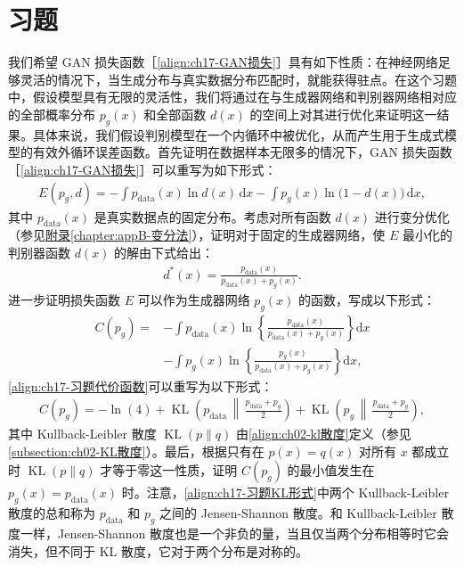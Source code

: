 \documentclass[../../main.tex]{subfiles}
\begin{document}
\section{习题}\label{section:ch17-习题}

\begin{exercise}[$\star\star\star$]\label{exercise:ch17-01}
我们希望 GAN 损失函数［\eqref{align:ch17-GAN损失}］具有如下性质：在神经网络足够灵活的情况下，当生成分布与真实数据分布匹配时，就能获得驻点。在这个习题中，假设模型具有无限的灵活性，我们将通过在与生成器网络和判别器网络相对应的全部概率分布 $p_g(x)$ 和全部函数 $d(x)$ 的空间上对其进行优化来证明这一结果。具体来说，我们假设判别模型在一个内循环中被优化，从而产生用于生成式模型的有效外循环误差函数。首先证明在数据样本无限多的情况下，GAN 损失函数［\eqref{align:ch17-GAN损失}］可以重写为如下形式：
\begin{align}
E(p_g,d)=-\int p_{\mathrm{data}}(x)\ln d(x)\,\mathrm{d}x-\int p_g(x)\ln\big(1-d(x)\big)\,\mathrm{d}x,
\label{align:ch17-习题积分形式}
\end{align}
其中 $p_{\mathrm{data}}(x)$ 是真实数据点的固定分布。考虑对所有函数 $d(x)$ 进行变分优化（参见\hyperref[chapter:appB-变分法]{附录\ref*{chapter:appB-变分法}}），证明对于固定的生成器网络，使 $E$ 最小化的判别器函数 $d(x)$ 的解由下式给出：
\begin{align}
d^*(x)=\frac{p_{\mathrm{data}}(x)}{p_{\mathrm{data}}(x)+p_g(x)}.
\label{align:ch17-习题最优判别器}
\end{align}
进一步证明损失函数 $E$ 可以作为生成器网络 $p_g(x)$ 的函数，写成以下形式：
\begin{align}
C(p_g)={}&-\int p_{\mathrm{data}}(x)\ln\left\{\frac{p_{\mathrm{data}}(x)}{p_{\mathrm{data}}(x)+p_g(x)}\right\}\mathrm{d}x\nonumber\\
&-\int p_g(x)\ln\left\{\frac{p_g(x)}{p_{\mathrm{data}}(x)+p_g(x)}\right\}\mathrm{d}x,
\label{align:ch17-习题代价函数}
\end{align}
\eqref{align:ch17-习题代价函数}可以重写为以下形式：
\begin{align}
C(p_g)=-\ln(4)+\operatorname{KL}\left(p_{\mathrm{data}}\,\middle\|\,\frac{p_{\mathrm{data}}+p_g}{2}\right)+\operatorname{KL}\left(p_g\,\middle\|\,\frac{p_{\mathrm{data}}+p_g}{2}\right),
\label{align:ch17-习题KL形式}
\end{align}
其中 Kullback-Leibler 散度 $\operatorname{KL}(p\|q)$ 由\eqref{align:ch02-kl散度}定义（参见\cref{subsection:ch02-KL散度}）。最后，根据只有在 $p(x)=q(x)$ 对所有 $x$ 都成立时 $\operatorname{KL}(p\|q)$ 才等于零这一性质，证明 $C(p_g)$ 的最小值发生在 $p_g(x)=p_{\mathrm{data}}(x)$ 时。注意，\eqref{align:ch17-习题KL形式}中两个 Kullback-Leibler 散度的总和称为 $p_{\mathrm{data}}$ 和 $p_g$ 之间的 Jensen-Shannon 散度。和 Kullback-Leibler 散度一样，Jensen-Shannon 散度也是一个非负的量，当且仅当两个分布相等时它会消失，但不同于 KL 散度，它对于两个分布是对称的。
\end{exercise}
\end{document}
